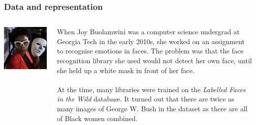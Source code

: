 \begin{frame}
\frametitle{Data and representation}
\begin{columns}
    \begin{column}{0.4\textwidth}
        \includegraphics[width=1\textwidth]{./misc_images/joy_buolamwini.jpg}
    \end{column}
    \begin{column}{0.59\textwidth}
        When Joy Buolamwini was a computer science undergrad at Georgia Tech in the early 2010s, she worked on an assignment to recognise emotions in faces. The problem was that the face recognition library she used would not detect her own face, until she held up a white mask in front of her face.
        \\~\\
        At the time, many libraries were trained on the \emph{Labelled Faces in the Wild} database. It turned out that there are twice as many images of George W. Bush in the dataset as there are all of Black women combined.
    \end{column}
\end{columns}
\end{frame}